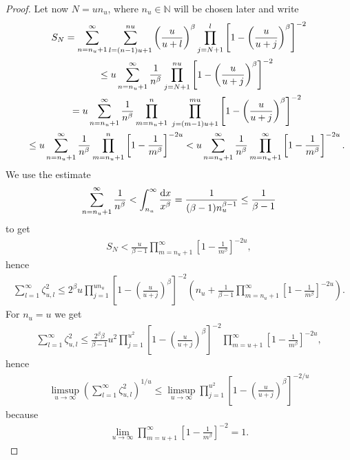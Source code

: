 \documentclass[pdftex]{sigma}
\numberwithin{equation}{section}
\begin{document}
\begin{proof}
Let now $N=u n_u$, where $n_u\in\mathbb N$ will be chosen later and write
\begin{gather*}
S_N = \sum_{n=n_u+1}^\infty \sum_{l=(n-1)u+1}^{nu}\left ( {u\over u+l}\right )^\beta\prod_{j=N+1}^l \left [1-\left ({u\over u+j}\right )^\beta\right ]^{-2}\\
\hphantom{S_N}{} \le u\sum_{n=n_u+1}^\infty \frac{1}{n^\beta}\prod_{j=N+1}^{nu} \left [1-\left ({u\over u+j}\right )^\beta\right ]^{-2}\\
\hphantom{S_N}{}= u\sum_{n=n_u+1}^\infty \frac{1}{n^\beta}\prod_{m=n_u+1}^n\; \prod_{j=(m-1)u+1}^{mu} \left [1-\left ({u\over u+j}\right )^\beta\right ]^{-2}\\
\hphantom{S_N}{} \le u\sum_{n=n_u+1}^\infty \frac{1}{n^\beta}\prod_{m=n_u+1}^n \left[1-\frac{1}{m^\beta}\right]^{-2u}
<u\sum_{n=n_u+1}^\infty \frac{1}{n^\beta}\prod_{m=n_u+1}^\infty \left[1-\frac{1}{m^\beta}\right]^{-2u}.
\end{gather*}
We use the estimate
\begin{gather*}
\sum_{n=n_u+1}^\infty\frac{1}{n^\beta}<\int_{n_u}^\infty\frac{{\rm d}x}{x^\beta}=\frac{1}{(\beta-1)n_u^{\beta-1}}\le \frac{1}{\beta-1}
\end{gather*}
to get
\begin{gather*}
S_N<\frac{u}{\beta-1}\prod_{m=n_u+1}^\infty \left[1-\frac{1}{m^\beta}\right]^{-2u},
\end{gather*}
hence
\begin{gather*}
\sum_{l=1}^\infty \zeta_{u,l}^2 \le 2^\beta u\prod_{j=1}^{un_u}\left[1-\left(\frac{u}{u+j}\right)^\beta\right]^{-2}\left(n_u+\frac{1}{\beta-1}\prod_{m=n_u+1}^\infty\left[1-\frac{1}{m^\beta}\right]^{-2u}\right).
\end{gather*}
For $n_u=u$ we get
\begin{gather*}
\sum_{l=1}^\infty \zeta_{u,l}^2 \le \frac{2^\beta \beta}{\beta-1} u^2\prod_{j=1}^{u^2}\left[1-\left(\frac{u}{u+j}\right)^\beta\right]^{-2}\prod_{m=u+1}^\infty\left[1-\frac{1}{m^\beta}\right]^{-2u},
\end{gather*}
hence
\begin{gather*}
\limsup_{u\to\infty}\left(\sum_{l=1}^\infty \zeta_{u,l}^2\right)^{1/u}\le \limsup_{u\to\infty}
\prod_{j=1}^{u^2}\left[1-\left(\frac{u}{u+j}\right)^\beta\right]^{-2/u}
\end{gather*}
because
\begin{gather*}
\lim_{u\to\infty}\prod_{m=u+1}^\infty\left[1-\frac{1}{m^\beta}\right]^{-2}=1.
\end{gather*}


\end{proof}
\end{document}
